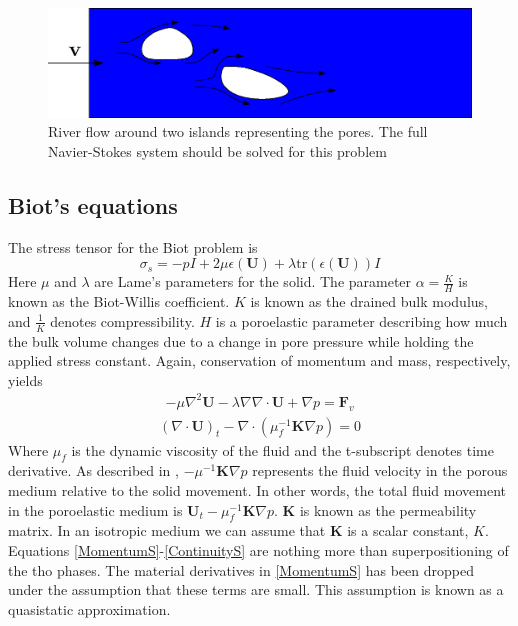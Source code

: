 \begin{center}
\begin{figure}[!ht]
\includegraphics[width=0.9\linewidth]{figures/Porous_Islands}
\caption{River flow around two islands representing the pores. The full Navier-Stokes system should be solved for this problem}
\end{figure}
\end{center}
\subsection{Biot's equations}
The stress tensor for the Biot problem is 
\[ \sigma_s = -pI + 2\mu \epsilon(\mathbf{U}) + \lambda\text{tr}(\epsilon(\mathbf{U}))I  \]
Here $\mu$ and $\lambda$ are Lame's parameters for the solid. The parameter $\alpha = \frac{K}{H}$ is known as the Biot-Willis coefficient. $K$ is known as the drained bulk modulus, and $\frac{1}{K}$ denotes compressibility. $H$ is a poroelastic parameter describing how much the bulk volume changes due to a change in pore pressure while holding the applied stress constant. Again, conservation of momentum and mass, respectively, yields
\begin{align}
	 - \mu \nabla ^2 \mathbf{U}
	 - \lambda \nabla \nabla \cdot \mathbf{U}
	 + \nabla p = \mathbf{F}_v \label{MomentumS}
\end{align}
\begin{align}
	 (\nabla \cdot \mathbf{U})_t
	 - \nabla \cdot (\mu_f^{-1} \mathbf{K} \nabla p) 
	 = 0 \label{ContinuityS}
\end{align}
Where $\mu_f$ is the dynamic viscosity of the fluid and the t-subscript denotes time derivative. As described in \cite{Niel13}, $-\mu^{-1}\mathbf{K} \nabla p$ represents the fluid velocity in the porous medium relative to the solid movement. In other words, the total fluid movement in the poroelastic medium is $\mathbf{U}_t - \mu_f^{-1}\mathbf{K} \nabla p$. $\mathbf{K}$ is known as the permeability matrix. In an isotropic medium we can assume that $\mathbf{K}$ is a scalar constant, $K$.
\\
Equations \eqref{MomentumS}-\eqref{ContinuityS} are nothing more than superpositioning of the tho phases. The material derivatives in \eqref{MomentumS} has been dropped under the assumption that these terms are small. This assumption is known as a quasistatic approximation. 
\\

